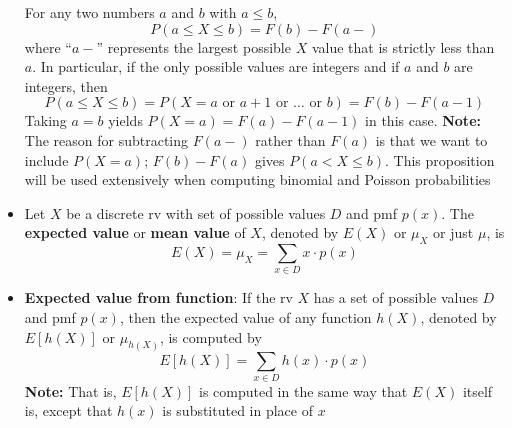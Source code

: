 \documentclass{report}
\begin{document}
\begin{itemize}
        For any two numbers \(a\) and \(b\) with \(a \leq b\),
        \[
            P(a \leq X \leq b) = F(b) - F(a-)
        \]
        where “\(a-\)” represents the largest possible \(X\) value that is strictly less than \(a\). In particular, if the only possible values are integers and if \(a\) and \(b\) are integers, then
        \[
            P(a \leq X \leq b) = P(X = a \text{ or } a + 1 \text{ or } \ldots \text{ or } b) = F(b) - F(a-1)
        \]
        Taking \(a = b\) yields \(P(X = a) = F(a) - F(a-1)\) in this case.
        \bigbreak \noindent 
        \textbf{Note:} The reason for subtracting \(F(a-)\) rather than \(F(a)\) is that we want to include \(P(X = a)\); \(F(b) - F(a)\) gives \(P(a < X \leq b)\). This proposition will be used extensively when computing binomial and Poisson probabilities 
    \item 
        Let \(X\) be a discrete rv with set of possible values \(D\) and pmf \(p(x)\). The \textbf{expected value} or \textbf{mean value} of \(X\), denoted by \(E(X)\) or \(\mu_X\) or just \(\mu\), is
        \[
            E(X) = \mu_X = \sum_{x \in D} x \cdot p(x)
        \]
    \item \textbf{Expected value from function}:
        If the rv \(X\) has a set of possible values \(D\) and pmf \(p(x)\), then the expected value of any function \(h(X)\), denoted by \(E[h(X)]\) or \(\mu_{h(X)}\), is computed by
        \[
            E[h(X)] = \sum_{x \in D} h(x) \cdot p(x)
        \]
        \bigbreak \noindent 
        \textbf{Note:} That is, $E[h(X)]$ is computed in the same way that $E(X)$ itself is, except that $h(x)$ is substituted in place of $x$


\end{itemize}
\end{document}
